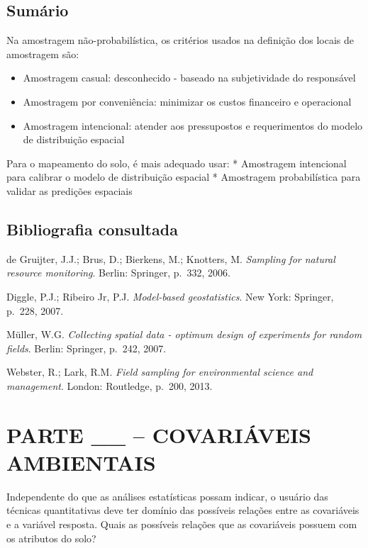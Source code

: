 \documentclass[]{book}
\providecommand{\tightlist}{%
  \setlength{\itemsep}{0pt}\setlength{\parskip}{0pt}}
\begin{document}
\section{Sumário}\label{sumario}

Na amostragem não-probabilística, os critérios usados na definição dos
locais de amostragem são:

\begin{itemize}
\tightlist
\item
  Amostragem casual: desconhecido - baseado na subjetividade do
  responsável
\item
  Amostragem por conveniência: minimizar os custos financeiro e
  operacional
\item
  Amostragem intencional: atender aos pressupostos e requerimentos do
  modelo de distribuição espacial
\end{itemize}

Para o mapeamento do solo, é mais adequado usar: * Amostragem
intencional para calibrar o modelo de distribuição espacial * Amostragem
probabilística para validar as predições espaciais

\section{Bibliografia consultada}\label{bibliografia-consultada}

de Gruijter, J.J.; Brus, D.; Bierkens, M.; Knotters, M. \emph{Sampling
for natural resource monitoring}. Berlin: Springer, p.~332, 2006.

Diggle, P.J.; Ribeiro Jr, P.J. \emph{Model-based geostatistics}. New
York: Springer, p.~228, 2007.

Müller, W.G. \emph{Collecting spatial data - optimum design of
experiments for random fields}. Berlin: Springer, p.~242, 2007.

Webster, R.; Lark, R.M. \emph{Field sampling for environmental science
and management}. London: Routledge, p.~200, 2013.

\chapter*{PARTE \_\_ -- COVARIÁVEIS
AMBIENTAIS}\label{parte-__-covariaveis-ambientais}

Independente do que as análises estatísticas possam indicar, o usuário
das técnicas quantitativas deve ter domínio das possíveis relações entre
as covariáveis e a variável resposta. Quais as possíveis relações que as
covariáveis possuem com os atributos do solo?
\end{document}
